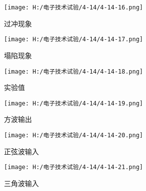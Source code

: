 \documentclass{article}
\begin{document}
            \begin{figure}[h]
              \begin{minipage}[t]{0.5\linewidth} %
                \centering   
                \texttt{[image: H:/电子技术试验/4-14/4-14-16.png]}   
                \caption{过冲现象}   
                \label{fig:side:a}   
              \end{minipage}%
              \begin{minipage}[t]{0.5\linewidth}   
                \centering   
                \texttt{[image: H:/电子技术试验/4-14/4-14-17.png]}   
                \caption{塌陷现象}   
                \label{fig:side:b}   
              \end{minipage}   
              \end{figure}
              \begin{figure}[h]
                \centering
                \texttt{[image: H:/电子技术试验/4-14/4-14-18.png]}
                \caption{实验值} \label{fig:aa}
            \end{figure}

            \begin{figure}[h]
              \begin{minipage}[t]{0.5\linewidth} %
                \centering   
                \texttt{[image: H:/电子技术试验/4-14/4-14-19.png]}   
                \caption{方波输出}   
                \label{fig:side:a}   
              \end{minipage}%
              \begin{minipage}[t]{0.5\linewidth}   
                \centering   
                \texttt{[image: H:/电子技术试验/4-14/4-14-20.png]}   
                \caption{正弦波输入}   
                \label{fig:side:b}   
              \end{minipage}   
              \end{figure}
              \begin{figure}[h]
                \centering
                \texttt{[image: H:/电子技术试验/4-14/4-14-21.png]}
                \caption{三角波输入} \label{fig:aa}
            \end{figure}
\end{document}
